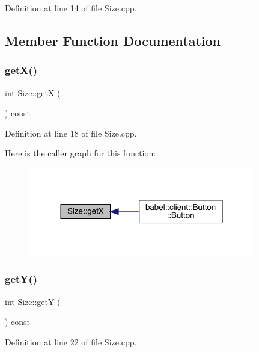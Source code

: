 Definition at line 14 of file Size.\+cpp.



\subsection{Member Function Documentation}
\mbox{\label{class_size_a09b31ec544a6d1e1901470998fa773d9}} 
\subsubsection{\texorpdfstring{get\+X()}{getX()}}
{\footnotesize\ttfamily int Size\+::getX (\begin{DoxyParamCaption}{ }\end{DoxyParamCaption}) const}



Definition at line 18 of file Size.\+cpp.

Here is the caller graph for this function\+:\nopagebreak
\begin{figure}[H]
\begin{center}
\leavevmode
\includegraphics[width=281pt]{class_size_a09b31ec544a6d1e1901470998fa773d9_icgraph}
\end{center}
\end{figure}
\mbox{\label{class_size_a1ff10ace4300deb61e377f6f63d122e6}} 
\subsubsection{\texorpdfstring{get\+Y()}{getY()}}
{\footnotesize\ttfamily int Size\+::getY (\begin{DoxyParamCaption}{ }\end{DoxyParamCaption}) const}



Definition at line 22 of file Size.\+cpp.

